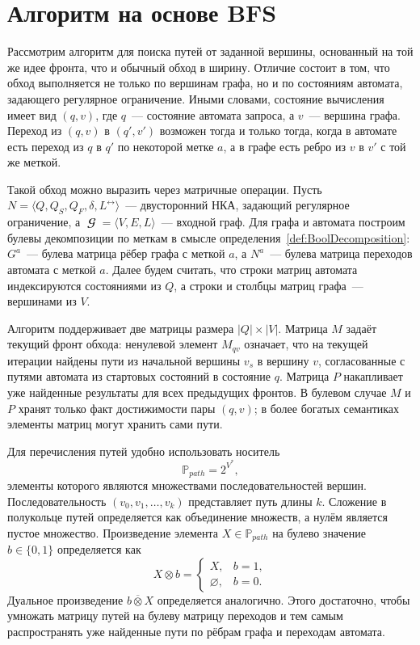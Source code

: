 \section{Алгоритм на основе BFS}
\label{sec:RPQ_BFS}

Рассмотрим алгоритм для поиска путей от заданной вершины, основанный на той же идее фронта, что и обычный обход в ширину.
Отличие состоит в том, что обход выполняется не только по вершинам графа, но и по состояниям автомата, задающего регулярное ограничение.
Иными словами, состояние вычисления имеет вид $(q, v)$, где $q$~--- состояние автомата запроса, а $v$~--- вершина графа.
Переход из $(q, v)$ в $(q', v')$ возможен тогда и только тогда, когда в автомате есть переход из $q$ в $q'$ по некоторой метке $a$, а в графе есть ребро из $v$ в $v'$ с той же меткой.

Такой обход можно выразить через матричные операции.
Пусть $N = \langle Q, Q_S, Q_F, \delta, L^{\leftrightarrow} \rangle$~--- двусторонний НКА, задающий регулярное ограничение, а $\mbfscrG = \langle V, E, L \rangle$~--- входной граф.
Для графа и автомата построим булевы декомпозиции по меткам в смысле определения~\ref{def:BoolDecomposition}: $G^a$~--- булева матрица рёбер графа с меткой $a$, а $N^a$~--- булева матрица переходов автомата с меткой $a$.
Далее будем считать, что строки матриц автомата индексируются состояниями из $Q$, а строки и столбцы матриц графа~--- вершинами из $V$.

Алгоритм поддерживает две матрицы размера $|Q| \times |V|$.
Матрица $M$ задаёт текущий фронт обхода: ненулевой элемент $M_{qv}$ означает, что на текущей итерации найдены пути из начальной вершины $v_s$ в вершину $v$, согласованные с путями автомата из стартовых состояний в состояние $q$.
Матрица $P$ накапливает уже найденные результаты для всех предыдущих фронтов.
В булевом случае $M$ и $P$ хранят только факт достижимости пары $(q,v)$; в более богатых семантиках элементы матриц могут хранить сами пути.

Для перечисления путей удобно использовать носитель
\[
    \mathbb{P}_{\mathit{path}} = 2^{V^*},
\]
элементы которого являются множествами последовательностей вершин.
Последовательность $(v_0, v_1, \dots, v_k)$ представляет путь длины $k$.
Сложение в полукольце путей определяется как объединение множеств, а нулём является пустое множество.
Произведение элемента $X \in \mathbb{P}_{\mathit{path}}$ на булево значение $b \in \{0,1\}$ определяется как
\[
    X \otimes b =
    \begin{cases}
        X, & b = 1, \\
        \varnothing, & b = 0.
    \end{cases}
\]
Дуальное произведение $b \overline{\otimes} X$ определяется аналогично.
Этого достаточно, чтобы умножать матрицу путей на булеву матрицу переходов и тем самым распространять уже найденные пути по рёбрам графа и переходам автомата.

